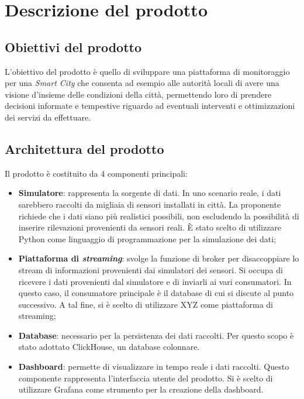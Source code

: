 \section{Descrizione del prodotto}
\subsection{Obiettivi del prodotto}
L'obiettivo del prodotto è quello di sviluppare una piattaforma di monitoraggio per una \textit{Smart City} che consenta
ad esempio alle autorità locali di avere una visione d'insieme delle condizioni della città, permettendo loro
di prendere decisioni informate e tempestive riguardo ad eventuali interventi e ottimizzazioni dei servizi da effettuare.

\subsection{Architettura del prodotto}
Il prodotto è costituito da 4 componenti principali:
\begin{itemize}
	\item \textbf{Simulatore}: rappresenta la sorgente di dati. In uno scenario reale, i dati sarebbero raccolti da migliaia di sensori
	      installati in città. La proponente richiede che i dati siano più realistici possibili, non escludendo la possibilità di inserire rilevazioni provenienti da sensori reali.
	      È stato scelto di utilizzare Python come linguaggio di programmazione per la simulazione dei dati;
	\item \textbf{Piattaforma di \textit{streaming}}: svolge la funzione di broker per disaccoppiare lo stream di informazioni provenienti dai simulatori dei sensori.
	      Si occupa di ricevere i dati provenienti dal simulatore e di inviarli ai vari consumatori. In questo caso, il consumatore principale è il database
	      di cui si discute al punto successivo.
	      A tal fine, si è scelto di utilizzare XYZ come piattaforma di streaming; %
	\item \textbf{Database}: necessario per la persistenza dei dati raccolti. Per questo scopo è stato adottato ClickHouse, un database colonnare.
	\item \textbf{Dashboard}: permette di visualizzare in tempo reale i dati raccolti. Questo componente rappresenta l'interfaccia utente del prodotto.
	      Si è scelto di utilizzare Grafana come strumento per la creazione della dashboard.
\end{itemize}

